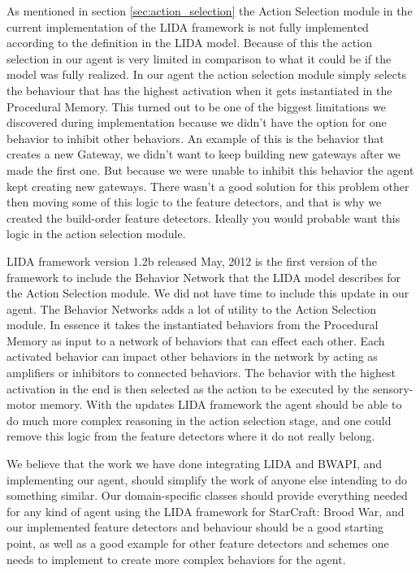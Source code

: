As mentioned in section \ref{sec:action_selection} the Action Selection module in the current implementation of the LIDA framework is not fully implemented according to the definition in the LIDA model. Because of this the action selection in our agent is very limited in comparison to what it could be if the model was fully realized. In our agent the action selection module simply selects the behaviour that has the highest activation when it gets instantiated in the Procedural Memory. This turned out to be one of the biggest limitations we discovered during implementation because we didn't have the option for one behavior to inhibit other behaviors. An example of this is the behavior that creates a new Gateway, we didn't want to keep building new gateways after we made the first one. But because we were unable to inhibit this behavior the agent kept creating new gateways. There wasn't a good solution for this problem other then moving some of this logic to the feature detectors, and that is why we created the build-order feature detectors. Ideally you would probable want this logic in the action selection module.

LIDA framework version 1.2b released May, 2012 is the first version of the framework to include the Behavior Network that the LIDA model describes for the Action Selection module. We did not have time to include this update in our agent. The Behavior Networks adds a lot of utility to the Action Selection module. In essence it takes the instantiated behaviors from the Procedural Memory as input to a network of behaviors that can effect each other. Each activated behavior can impact other behaviors in the network by acting as amplifiers or inhibitors to connected behaviors. The behavior with the highest activation in the end is then selected as the action to be executed by the sensory-motor memory. With the updates LIDA framework the agent should be able to do much more complex reasoning in the action selection stage, and one could remove this logic from the feature detectors where it do not really belong.

We believe that the work we have done integrating LIDA and BWAPI, and implementing our agent, should simplify the work of anyone else intending to do something similar. Our domain-specific classes should provide everything needed for any kind of agent using the LIDA framework for StarCraft: Brood War, and our implemented feature detectors and behaviour should be a good starting point, as well as a good example for other feature detectors and schemes one needs to implement to create more complex behaviors for the agent.


